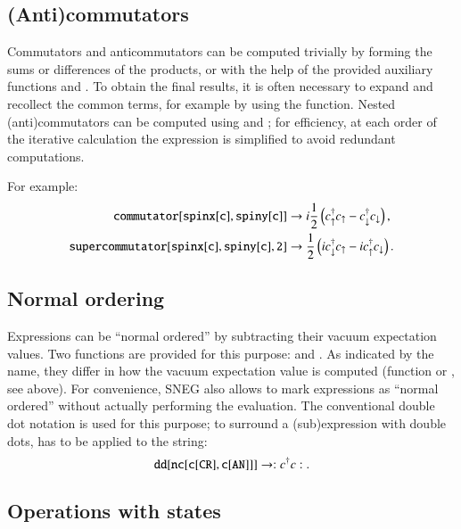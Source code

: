 \documentclass[3p,number,preprint]{elsarticle}
\begin{document}
\subsection{(Anti)commutators}

Commutators and anticommutators can be computed trivially by forming
the sums or differences of the products, or with the help of the
provided auxiliary functions  and
. To obtain the final results, it is often
necessary to expand and recollect the common terms, for example by
using the  function. Nested (anti)commutators can be
computed using  and ;
for efficiency, at each order of the iterative calculation the
expression is simplified to avoid redundant computations.

For example:
%
\begin{equation}
\begin{split}
{\tt commutator[spinx[c],spiny[c]]} &\to i \frac{1}{2}
\left( c^\dag_\uparrow c_\uparrow - c^\dag_\downarrow c_\downarrow
\right), \\
{\tt supercommutator[spinx[c],spiny[c],2]} &\to
\frac{1}{2} \left( i c^\dag_\downarrow c_\uparrow
- i c^\dag_\uparrow c_\downarrow \right).
\end{split}
\end{equation}


\subsection{Normal ordering}

Expressions can be ``normal ordered'' by subtracting their vacuum
expectation values. Two functions are provided for this purpose:
 and . As indicated by the name,
they differ in how the vacuum expectation value is computed (function
 or , see above). For convenience, SNEG also
allows to mark expressions as ``normal ordered'' without actually
performing the evaluation. The conventional double dot notation is
used for this purpose; to surround a (sub)expression with double dots,
 has to be applied to the string:
%
\begin{equation}
{\tt dd[nc[c[CR],c[AN]]]} \to : c^\dag c :.
\end{equation}


\subsection{Operations with states}
\end{document}
